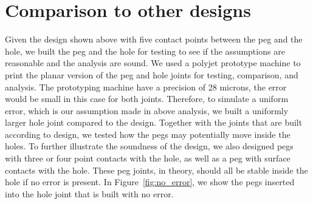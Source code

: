 \documentclass[11pt, twocolumn]{article}
\begin{document}
\section{Comparison to other designs}

Given the design shown above with five contact points between the peg and the hole, we built the peg and the hole for testing to see if the assumptions are reasonable and the analysis are sound. We used a polyjet prototype machine to print the planar version of the peg and hole joints for testing, comparison, and analysis. The prototyping machine have a precision of 28 microns, the error would be small in this case for both joints. Therefore, to simulate a uniform error, which is our assumption made in above analysis, we built a uniformly larger hole joint compared to the design. Together with the joints that are built according to design, we tested how the pegs may potentially move inside the holes. To further illustrate the soundness of the design, we also designed pegs with three or four point contacts with the hole, as well as a peg with surface contacts with the hole. These peg joints, in theory, should all be stable inside the hole if no error is present. In Figure~\ref{fig:no_error}, we show the pegs inserted into the hole joint that is built with no error. 
\end{document}
